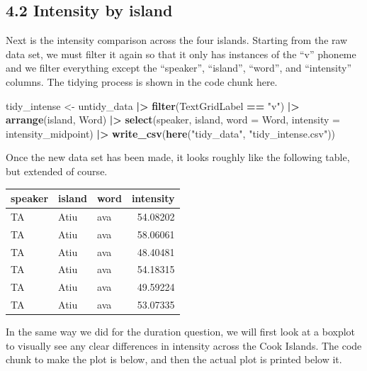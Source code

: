 \documentclass[
  ,man,floatsintext]{apa6}
\newenvironment{Shaded}{\begin{snugshade}}{\end{snugshade}}
\newcommand{\AttributeTok}[1]{\textcolor[rgb]{0.13,0.29,0.53}{#1}}
\newcommand{\FunctionTok}[1]{\textcolor[rgb]{0.13,0.29,0.53}{\textbf{#1}}}
\newcommand{\NormalTok}[1]{#1}
\newcommand{\OtherTok}[1]{\textcolor[rgb]{0.56,0.35,0.01}{#1}}
\newcommand{\SpecialCharTok}[1]{\textcolor[rgb]{0.81,0.36,0.00}{\textbf{#1}}}
\newcommand{\StringTok}[1]{\textcolor[rgb]{0.31,0.60,0.02}{#1}}
\begin{document}
\subsection{4.2 Intensity by island}\label{intensity-by-island}

Next is the intensity comparison across the four islands. Starting from the raw data set, we must filter it again so that it only has instances of the ``v'' phoneme and we filter everything except the ``speaker'', ``island'', ``word'', and ``intensity'' columns. The tidying process is shown in the code chunk here.

\begin{Shaded}
\begin{Highlighting}[]
\NormalTok{tidy\_intense }\OtherTok{\textless{}{-}}\NormalTok{ untidy\_data }\SpecialCharTok{|\textgreater{}}
  \FunctionTok{filter}\NormalTok{(TextGridLabel }\SpecialCharTok{==} \StringTok{"v"}\NormalTok{) }\SpecialCharTok{|\textgreater{}}  
  \FunctionTok{arrange}\NormalTok{(island, Word) }\SpecialCharTok{|\textgreater{}}  
  \FunctionTok{select}\NormalTok{(speaker, island, }\AttributeTok{word =}\NormalTok{ Word, }\AttributeTok{intensity =}\NormalTok{ intensity\_midpoint) }\SpecialCharTok{|\textgreater{}}
  \FunctionTok{write\_csv}\NormalTok{(}\FunctionTok{here}\NormalTok{(}\StringTok{"tidy\_data"}\NormalTok{, }\StringTok{"tidy\_intense.csv"}\NormalTok{))}
\end{Highlighting}
\end{Shaded}

Once the new data set has been made, it looks roughly like the following table, but extended of course.

\begin{tabular}{l|l|l|r}
\hline
speaker & island & word & intensity\\
\hline
TA & Atiu & ava & 54.08202\\
\hline
TA & Atiu & ava & 58.06061\\
\hline
TA & Atiu & ava & 48.40481\\
\hline
TA & Atiu & ava & 54.18315\\
\hline
TA & Atiu & ava & 49.59224\\
\hline
TA & Atiu & ava & 53.07335\\
\hline
\end{tabular}

In the same way we did for the duration question, we will first look at a boxplot to visually see any clear differences in intensity across the Cook Islands. The code chunk to make the plot is below, and then the actual plot is printed below it.
\end{document}
